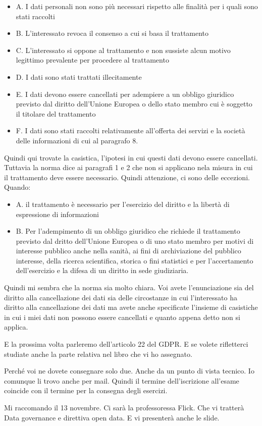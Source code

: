 \begin{itemize}
    \item A. I dati personali non sono più necessari rispetto alle finalità per i quali sono stati raccolti
    \item B. L'interessato revoca il consenso a cui si basa il trattamento
    \item C. L'interessato si oppone al trattamento e non sussiste alcun motivo legittimo prevalente per procedere al trattamento
    \item D. I dati sono stati trattati illecitamente
    \item E. I dati devono essere cancellati per adempiere a un obbligo giuridico previsto dal diritto dell'Unione Europea o dello stato membro cui è soggetto il titolare del trattamento 
    \item F. I dati sono stati raccolti relativamente all'offerta dei servizi e la società delle informazioni di cui al paragrafo 8.
\end{itemize}

Quindi qui trovate la casistica, l'ipotesi in cui questi dati devono essere cancellati.
Tuttavia la norma dice ai paragrafi 1 e 2 che non si applicano nela misura in cui il trattamento deve essere necessario.
Quindi attenzione, ci sono delle eccezioni.
Quando:
\begin{itemize}
    \item A. il trattamento è necessario per l'esercizio del diritto e la libertà di espressione di informazioni 
    \item B. Per l'adempimento di un obbligo giuridico che richiede il trattamento previsto dal dritto dell'Unione Europea o di uno stato membro per motivi di interesse pubblico anche nella sanità, ai fini di archiviazione del pubblico interesse, della ricerca scientifica, storica o fini statistici e per l'accertamento dell'esercizio e la difesa di un diritto in sede giudiziaria.
\end{itemize} 
Quindi mi sembra che la norma sia molto chiara.
Voi avete l'enunciazione sia del diritto alla cancellazione dei dati sia delle circostanze in cui l'interessato ha diritto alla cancellazione dei dati ma avete anche specificate l'insieme di casistiche in cui i miei dati non possono essere cancellati e quanto appena detto non si applica.

E la prossima volta parleremo dell'articolo 22 del GDPR.
E se volete rifletterci studiate anche la parte relativa nel libro che vi ho assegnato.


Perché voi ne dovete consegnare solo due.
Anche da un punto di vista tecnico.
Io comunque li trovo anche per mail.
Quindi il termine dell'iscrizione all'esame coincide con il termine per la consegna degli esercizi.

Mi raccomando il 13 novembre. Ci sarà la professoressa Flick. Che vi tratterà Data governance e direttiva open data.
E vi presenterà anche le slide.
